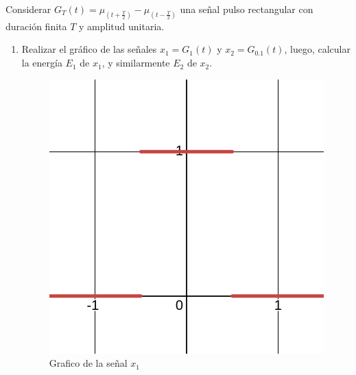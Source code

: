 \documentclass[12pt,a4paper]{report}
\begin{document}
Considerar $G_T(t) = \mu_{(t + \frac{T}{2})} - \mu_{(t - \frac{T}{2})}$ una señal pulso rectangular con duración finita
$T$ y amplitud unitaria.

\begin{enumerate}[label=\alph*),left=0pt]

  \item Realizar el gráfico de las señales $x_1 = G_1(t)$ y $x_2 = G_{0.1}(t)$, luego, calcular la energía $E_1$ de 
    $x_1$, y similarmente $E_2$ de $x_2$.

    \begin{figure}[h!]
      \hspace{6mm}
      \begin{minipage}{0.45\textwidth}
        \centering
        \includegraphics[width=\textwidth]{images/ej3.1}
        \caption{Grafico de la señal $x_1$}
        \label{fig:imagen1}
      \end{minipage}
      \hfill
      \begin{minipage}{0.45\textwidth}

\end{minipage}
\end{figure}
\end{enumerate}
\end{document}

